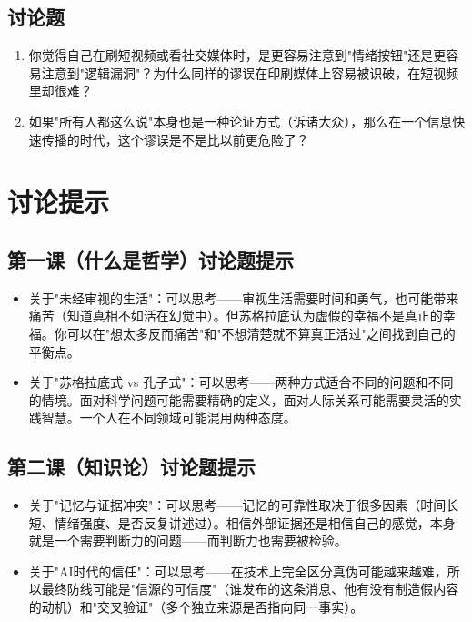 \documentclass[a4paper,12pt]{ctexart}
\begin{document}
\subsection*{讨论题}
\begin{enumerate}
  \item 你觉得自己在刷短视频或看社交媒体时，是更容易注意到"情绪按钮"还是更容易注意到"逻辑漏洞"？为什么同样的谬误在印刷媒体上容易被识破，在短视频里却很难？
  \item 如果"所有人都这么说"本身也是一种论证方式（诉诸大众），那么在一个信息快速传播的时代，这个谬误是不是比以前更危险了？
\end{enumerate}

\section*{讨论提示}

\subsection*{第一课（什么是哲学）讨论题提示}
\begin{itemize}
  \item 关于"未经审视的生活"：可以思考——审视生活需要时间和勇气，也可能带来痛苦（知道真相不如活在幻觉中）。但苏格拉底认为虚假的幸福不是真正的幸福。你可以在"想太多反而痛苦"和"不想清楚就不算真正活过"之间找到自己的平衡点。
  \item 关于"苏格拉底式 vs 孔子式"：可以思考——两种方式适合不同的问题和不同的情境。面对科学问题可能需要精确的定义，面对人际关系可能需要灵活的实践智慧。一个人在不同领域可能混用两种态度。
\end{itemize}

\subsection*{第二课（知识论）讨论题提示}
\begin{itemize}
  \item 关于"记忆与证据冲突"：可以思考——记忆的可靠性取决于很多因素（时间长短、情绪强度、是否反复讲述过）。相信外部证据还是相信自己的感觉，本身就是一个需要判断力的问题——而判断力也需要被检验。
  \item 关于"AI时代的信任"：可以思考——在技术上完全区分真伪可能越来越难，所以最终防线可能是"信源的可信度"（谁发布的这条消息、他有没有制造假内容的动机）和"交叉验证"（多个独立来源是否指向同一事实）。
\end{itemize}
\end{document}
